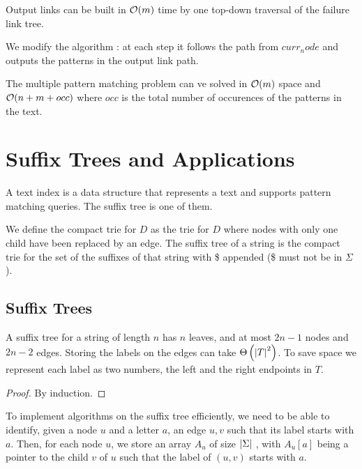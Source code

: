 \documentclass{cours}
\begin{document}
\begin{proposition}
    Output links can be built in $\mathcal{O}(m)$ time by one top-down traversal of the failure link tree.
\end{proposition}

We modify the algorithm : at each step it follows the path from $curr_node$ and outputs the patterns in the output link path.

\begin{theorem} 
    The multiple pattern matching problem can ve solved in $\mathcal{O}(m)$ space and $\mathcal{O}(n + m + occ)$ where $occ$ is the total number of occurences of the patterns in the text.
\end{theorem}

\section{Suffix Trees and Applications}
\begin{definition}
    A text index is a data structure that represents a text and supports pattern matching queries. The suffix tree is one of them. 

    We define the compact trie for $D$ as the trie for $D$ where nodes with only one child have been replaced by an edge. The suffix tree of a string is the compact trie for the set of the suffixes of that string with \$ appended (\$ must not be in $\Sigma$).
\end{definition}

\subsection{Suffix Trees}
\begin{proposition}
    A suffix tree for a string of length $n$ has $n$ leaves, and at most $2n - 1$ nodes and $2n - 2$ edges. Storing the labels on the edges can take $\Theta\left(\left|T\right|^{2}\right)$. To save space we represent each label as two numbers, the left and the right endpoints in $T$.
\end{proposition}
\begin{proof}
    By induction.
\end{proof}

To implement algorithms on the suffix tree efficiently, we need to be able to identify, given a node $u$ and a letter $a$, an edge $u, v$ such that its label starts with $a$. Then, for each node $u$, we store an array $A_{u}$ of size $\left|\Sigma\right|$ , with $A_{u}[a]$ being a pointer to the child $v$ of $u$ such that the label of $(u, v)$ starts with $a$.
\end{document}
